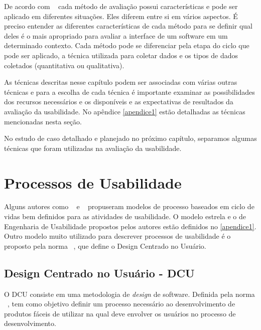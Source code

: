De acordo com ~ cada método de avaliação possui características e pode ser aplicado em diferentes situações.
%
Eles diferem entre si em vários aspectos. É preciso entender as diferentes características de cada método para se definir qual deles é o mais apropriado para avaliar a interface de um software em um determinado contexto.
%
Cada método pode se diferenciar pela etapa do ciclo que pode ser aplicado, a técnica utilizada para coletar dados e os tipos de dados coletados (quantitativa ou qualitativa). 

As técnicas descritas nesse capítulo podem ser associadas com várias outras técnicas e para a escolha de cada técnica é importante examinar as possibilidades dos recursos necessários e os disponíveis e as expectativas de resultados da avaliação da usabilidade. 
%
No apêndice \ref{apendice1} estão detalhadas as técnicas mencionadas nesta seção.

No estudo de caso detalhado e planejado no próximo capítulo, separamos algumas técnicas que foram utilizadas na avaliação da usabilidade.



\section{Processos de Usabilidade}


	Alguns autores como ~ e ~ propuseram modelos de processo baseados em ciclo de vidas bem definidos para as atividades de usabilidade. O modelo estrela e o de Engenharia de Usabilidade propostos pelos autores estão definidos no \ref{apendice1}. 
	Outro modelo muito utilizado para descrever processos de usabilidade é o proposto pela norma ~, que define o Design Centrado no Usuário.


\subsection{Design Centrado no Usuário - DCU}

O DCU consiste em uma metodologia de \emph{design} de software. Definida pela norma ~, tem como objetivo definir um processo necessário ao desenvolvimento de produtos fáceis de utilizar na qual deve envolver os usuários no processo de desenvolvimento.

